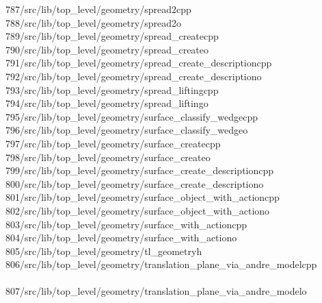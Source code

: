 \begin{tabbing}
787\>/src/lib/top\_level/geometry/spread2cpp\\[0pt]
788\>/src/lib/top\_level/geometry/spread2o\\[0pt]
789\>/src/lib/top\_level/geometry/spread\_createcpp\\[0pt]
790\>/src/lib/top\_level/geometry/spread\_createo\\[0pt]
791\>/src/lib/top\_level/geometry/spread\_create\_descriptioncpp\\[0pt]
792\>/src/lib/top\_level/geometry/spread\_create\_descriptiono\\[0pt]
793\>/src/lib/top\_level/geometry/spread\_liftingcpp\\[0pt]
794\>/src/lib/top\_level/geometry/spread\_liftingo\\[0pt]
795\>/src/lib/top\_level/geometry/surface\_classify\_wedgecpp\\[0pt]
796\>/src/lib/top\_level/geometry/surface\_classify\_wedgeo\\[0pt]
797\>/src/lib/top\_level/geometry/surface\_createcpp\\[0pt]
798\>/src/lib/top\_level/geometry/surface\_createo\\[0pt]
799\>/src/lib/top\_level/geometry/surface\_create\_descriptioncpp\\[0pt]
800\>/src/lib/top\_level/geometry/surface\_create\_descriptiono\\[0pt]
801\>/src/lib/top\_level/geometry/surface\_object\_with\_actioncpp\\[0pt]
802\>/src/lib/top\_level/geometry/surface\_object\_with\_actiono\\[0pt]
803\>/src/lib/top\_level/geometry/surface\_with\_actioncpp\\[0pt]
804\>/src/lib/top\_level/geometry/surface\_with\_actiono\\[0pt]
805\>/src/lib/top\_level/geometry/tl\_geometryh\\[0pt]
806\>/src/lib/top\_level/geometry/translation\_plane\_via\_andre\_modelcpp\\[0pt]
\>\\[0pt]
807\>/src/lib/top\_level/geometry/translation\_plane\_via\_andre\_modelo\\[0pt]

\end{tabbing}

